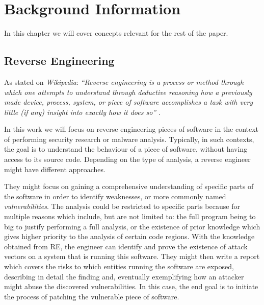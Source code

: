 \chapter{Background Information} %


In this chapter we will cover concepts relevant for the rest of the paper. %


\section{Reverse Engineering} %

As stated on \emph{Wikipedia}: \emph{``Reverse engineering is a process or method through which one attempts to understand through deductive reasoning how a previously made device, process, system, or piece of software accomplishes a task with very little (if any) insight into exactly how it does so''} \cite{re_wiki}.


In this work we will focus on reverse engineering pieces of software in the context of performing security research or malware analysis. Typically, in such contexts, the goal is to understand the behaviour of a piece of software, without having access to its source code. Depending on the type of analysis, a reverse engineer might have different approaches. 

They might focus on gaining a comprehensive understanding of specific parts of the software in order to identify weaknesses, or more commonly named \emph{vulnerabilities}. The analysis could be restricted to specific parts because for multiple reasons which include, but are not limited to: the full program being to big to justify performing a full analysis, or the existence of prior knowledge which gives higher priority to the analysis of certain code regions. With the knowledge obtained from RE, the engineer can identify and prove the existence of attack vectors on a system that is running this software. They might then write a report which covers the risks to which entities running the software are exposed, describing in detail the finding and, eventually exemplifying how an attacker might abuse the discovered vulnerabilities. In this case, the end goal is to initiate the process of patching the vulnerable piece of software. %

